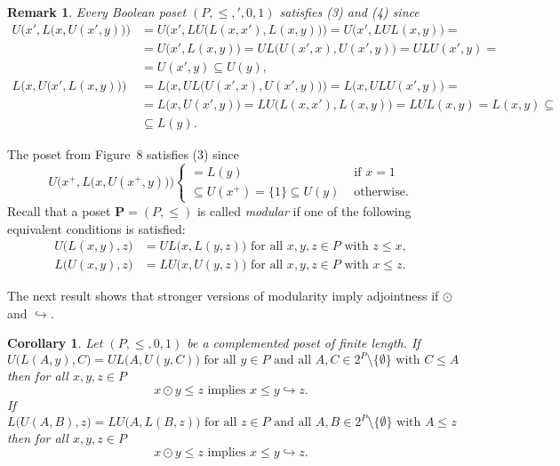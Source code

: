 \documentclass[12pt]{article}
\newtheorem{remark}[theorem]{Remark}
\newtheorem{corollary}[theorem]{Corollary}
\begin{document}
\begin{remark}
Every Boolean poset $(P,\le,{}',0,1)$ satisfies {\rm(3)} and {\rm(4)} since
\begin{align*}
U\Big(x',L\big(x,U(x',y)\big)\Big) & =U\Big(x',LU\big(L(x,x'),L(x,y)\big)\Big)=U\big(x',LUL(x,y)\big)= \\
& =U\big(x',L(x,y)\big)=UL\big(U(x',x),U(x',y)\big)=ULU(x',y)= \\
& =U(x',y)\subseteq U(y), \\
L\Big(x,U\big(x',L(x,y)\big)\Big) & =L\Big(x,UL\big(U(x',x),U(x',y)\big)\Big)=L\big(x,ULU(x',y)\big)= \\
& =L\big(x,U(x',y)\big)=LU\big(L(x,x'),L(x,y)\big)=LUL(x,y)=L(x,y)\subseteq \\
& \subseteq L(y).
\end{align*}
\end{remark}	

The poset from Figure~8 satisfies (3) since
\[
U\Big(x^+,L\big(x,U(x^+,y)\big)\Big)\left\{
\begin{array}{ll}
=L(y)                                & \text{ if }x=1 \\
\subseteq U(x^+)=\{1\}\subseteq U(y) & \text{ otherwise}.
\end{array}
\right.
\]
Recall that a poset $\mathbf P=(P,\le)$ is called {\em modular} if one of the following equivalent conditions is satisfied:
\begin{align*}
U\big(L(x,y),z\big) & =UL\big(x,L(y,z)\big)\text{ for all }x,y,z\in P\text{ with }z\le x, \\
L\big(U(x,y),z\big) & =LU\big(x,U(y,z)\big)\text{ for all }x,y,z\in P\text{ with }x\le z.
\end{align*}

The next result shows that stronger versions of modularity imply adjointness if $\odot$ and $\hookrightarrow$.

\begin{corollary}\label{cor1}
Let $(P,\le,0,1)$ be a complemented poset of finite length. If
\begin{equation}
U\big(L(A,y),C\big)=UL\big(A,U(y,C)\big)\text{ for all }y\in P\text{ and all }A,C\in2^P\setminus\{\emptyset\}\text{ with }C\le A
\end{equation}
then for all $x,y,z\in P$
\[
x\odot y\le z\text{ implies }x\le y\hookrightarrow z.
\]
If
\begin{equation}
L\big(U(A,B),z\big)=LU\big(A,L(B,z)\big)\text{ for all }z\in P\text{ and all }A,B\in2^P\setminus\{\emptyset\}\text{ with }A\le z
\end{equation}
then for all $x,y,z\in P$
\[
x\odot y\le z\text{ implies }x\le y\hookrightarrow z.
\]
\end{corollary}
\end{document}
